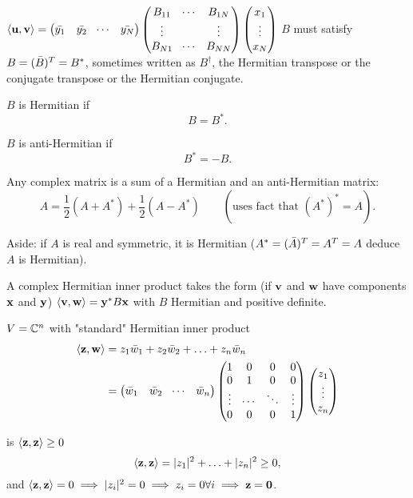 \documentclass[10pt, a4paper]{article}
\begin{document}
$\langle\mathbf{u}, \mathbf{v}\rangle =
\begin{pmatrix}
    \Bar{y_1} & \Bar{y_2} & \dotsi & \Bar{y_N}
\end{pmatrix}\begin{pmatrix}
    B_{11} & \dotsi & B_{1N} \\
    \vdots &  & \vdots \\
    B_{N1} & \dotsi & B_{NN}
\end{pmatrix}\begin{pmatrix}
    x_1 \\ \vdots \\ x_{N}
\end{pmatrix}$
$B$ must satisfy $B = (\Bar{B}) ^ T = B ^ {*}$,
sometimes written as $B ^ {\dagger}$,
the Hermitian transpose or the conjugate transpose or the Hermitian conjugate.

$B$ is Hermitian if
\[
B = B ^ {*}.
\]

$B$ is anti-Hermitian if
\[
B ^ {*} = -B.
\]

Any complex matrix is a sum of a Hermitian and an anti-Hermitian matrix:
\[
A = \frac{1}{2}(A + A ^ {*}) + \frac{1}{2}(A - A ^ {*})\qquad(\text{uses fact that $(A ^ {*}) ^ {*} = A$}).
\]

Aside:
if $A$ is real and symmetric,
it is Hermitian
($A ^ {*} = (\Bar{A}) ^ T = A ^ T = A$ deduce $A$ is Hermitian).

A complex Hermitian inner product takes the form
(if $\mathbf{v}$ and $\mathbf{w}$ have components $\mathbf{x}$ and $\mathbf{y}$)
$\langle\mathbf{v}, \mathbf{w}\rangle = \mathbf{y} ^ {*}B\mathbf{x}$ with $B$ Hermitian and positive definite.

\begin{example}
    $V = \mathbb{C} ^ n$ with "standard" Hermitian inner product
    \begin{align*}
        \langle\mathbf{z}, \mathbf{w}\rangle &= z_1\Bar{w}_1 + z_2\Bar{w}_2 + \dotsc + z_n\Bar{w}_n \\
        &= \begin{pmatrix}
            \Bar{w}_1 & \Bar{w}_2 & \dotsi & \Bar{w}_n
        \end{pmatrix}\begin{pmatrix}
            1 & 0 & 0 & 0 \\
            0 & 1 & 0 & 0 \\
            \vdots & \dotsi & \ddots & \vdots \\
            0 & 0 & 0 & 1
        \end{pmatrix}
        \begin{pmatrix}
            z_1 \\
            \vdots \\
            z_n
        \end{pmatrix}
    \end{align*}

    is $\langle\mathbf{z}, \mathbf{z}\rangle \geq 0$
    \[
    \langle\mathbf{z}, \mathbf{z}\rangle = |z_1| ^ 2 + \dotsc + |z_n| ^ 2 \geq 0,
    \]
    and $\langle\mathbf{z}, \mathbf{z}\rangle = 0 \implies |z_i| ^ 2 = 0 \implies z_i = 0 \forall i \implies \mathbf{z} = \mathbf{0}$.
\end{example}
\end{document}
